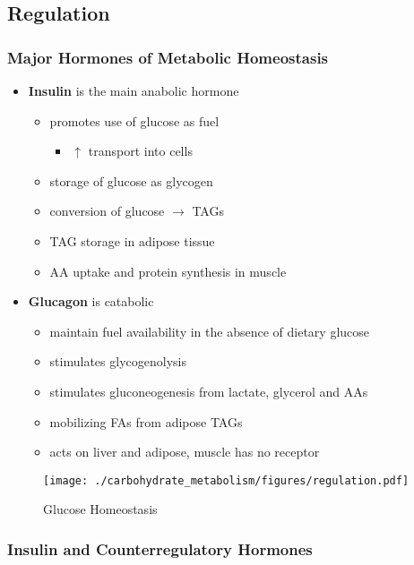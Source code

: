 \documentclass{scrartcl}
\begin{document}
\subsection{Regulation}
\label{sec:org7a66320}
\subsubsection{Major Hormones of Metabolic Homeostasis}
\label{sec:org006eeec}
\begin{itemize}
\item \textbf{Insulin} is the main anabolic hormone
\begin{itemize}
\item promotes use of glucose as fuel
\begin{itemize}
\item \(\uparrow\) transport into cells
\end{itemize}
\item storage of glucose as glycogen
\item conversion of glucose \(\to\) TAGs
\item TAG storage in adipose tissue
\item AA uptake and protein synthesis in muscle
\end{itemize}
\item \textbf{Glucagon} is catabolic
\begin{itemize}
\item maintain fuel availability in the absence of dietary glucose
\item stimulates glycogenolysis
\item stimulates gluconeogenesis from lactate, glycerol and AAs
\item mobilizing FAs from adipose TAGs
\item acts on liver and adipose, muscle has no receptor
\end{itemize}
\end{itemize}

\begin{figure}[htbp]
\centering
\texttt{[image: ./carbohydrate\_metabolism/figures/regulation.pdf]}
\caption{\label{fig:orge8817ea}
Glucose Homeostasis}
\end{figure}

\subsubsection{Insulin and Counterregulatory Hormones}
\label{sec:org687c069}
\end{document}
